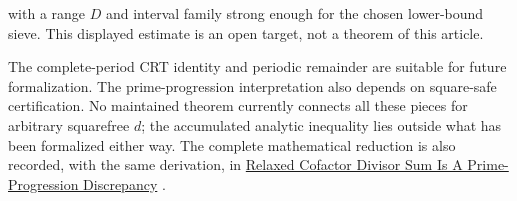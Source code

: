 with a range $D$ and interval family strong enough for the chosen lower-bound
sieve. This displayed estimate is an open target, not a theorem of this
article.

The complete-period CRT identity and periodic remainder are suitable for
future formalization. The prime-progression interpretation also depends on
square-safe certification. No maintained theorem currently connects all these
pieces for arbitrary squarefree $d$; the accumulated analytic inequality lies
outside what has been formalized either way.
The complete mathematical reduction is also recorded, with the same
derivation, in \href{https://github.com/thiagomata/prime-numbers/blob/master/properties/sieve-sequence/relaxed-cofactor-divisor-sum-is-prime-progression-discrepancy.md}{Relaxed Cofactor
Divisor Sum Is A Prime-Progression Discrepancy} \cite{cofactordiscrepancy2026}.
